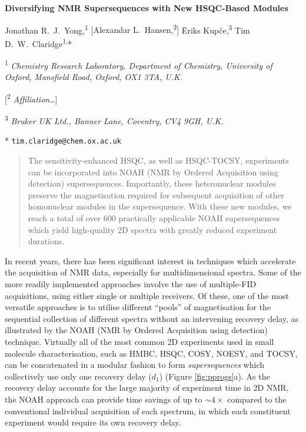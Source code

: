 \documentclass[11pt]{article}
\newcommand*{\hl}[1]{\textcolor{WildStrawberry}{#1}}
\newcommand*{\proton}{\ce{^{1}H}}
\newcommand*{\figref}[1]{Figure \ref{fig:#1}}
\begin{document}
\begin{center}
    \Large \textbf{Diversifying NMR Supersequences with New HSQC-Based Modules}

    \vspace{0.2cm}

    \large Jonathan R.\ J.\ Yong,\textsuperscript{1} \hl{[Alexandar L.\ Hansen,\textsuperscript{2}]} {\=E}riks Kup{\v{c}}e,\textsuperscript{3} Tim D.\ W.\ Claridge\textsuperscript{1,}*

    \vspace{0.2cm}

    \normalsize

    \textsuperscript{1} \textit{Chemistry Research Laboratory, Department of Chemistry, University of Oxford, Mansfield Road, Oxford, OX1 3TA, U.K.}

    \hl{[\textsuperscript{2} \textit{Affiliation\ldots}]}

    \textsuperscript{3} \textit{Bruker UK Ltd., Banner Lane, Coventry, CV4 9GH, U.K.}

    * \texttt{tim.claridge@chem.ox.ac.uk}
\end{center}
\vspace{0.5cm}
\begin{abstract}
    The sensitivity-enhanced HSQC, as well as HSQC-TOCSY, experiments can be incorporated into NOAH (NMR by Ordered Acquisition using \proton{} detection) supersequences.
    Importantly, these heteronuclear modules preserve the magnetisation required for subsequent acquisition of other homonuclear modules in the supersequence.
    With these new modules, we reach a total of over 600 practically applicable NOAH supersequences which yield high-quality 2D spectra with greatly reduced experiment durations.
\end{abstract}


In recent years, there has been significant interest in techniques which accelerate the acquisition of NMR data, especially for multidimensional spectra.\autocite{ultrafast, timeshared, multireceive}
Some of the more readily implemented approaches involve the use of multiple-FID acquisitions, using either single or multiple receivers.
Of these, one of the most versatile approaches is to utilise different ``pools'' of magnetisation for the sequential collection of different spectra without an intervening recovery delay, as illustrated by the NOAH (NMR by Ordered Acquisition using \proton{} detection) technique.\autocite{noah}
Virtually all of the most common 2D experiments used in small molecule characterisation, such as HMBC, HSQC, COSY, NOESY, and TOCSY, can be concatenated in a modular fashion to form \textit{supersequences} which collectively use only one recovery delay ($d_1$) (\figref{pprogs}a).
As the recovery delay accounts for the large majority of experiment time in 2D NMR, the NOAH approach can provide time savings of up to $\sim 4\times$ compared to the conventional individual acquisition of each spectrum, in which each constituent experiment would require its own recovery delay.
\end{document}
